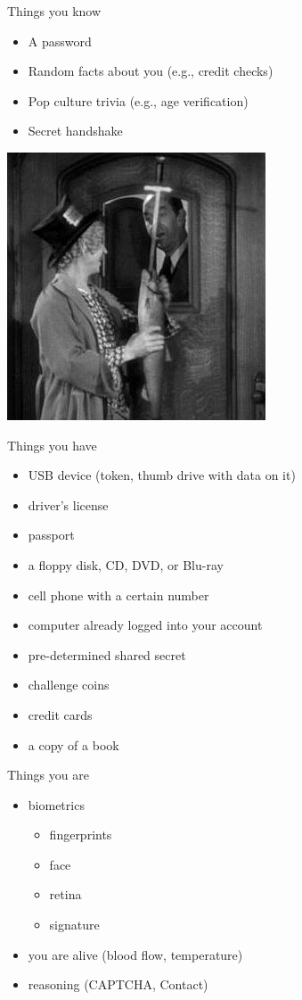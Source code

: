 \documentclass{beamer}
\begin{document}
\begin{frame}{Things you know}

\begin{itemize}
  \item A password
  \item Random facts about you (e.g., credit checks)
  \item Pop culture trivia (e.g., age verification)
  \item Secret handshake
\end{itemize}

\begin{center}
  \includegraphics[width=.4\textwidth]{swordfish.jpg}
\end{center}

\end{frame}

\begin{frame}{Things you have}

\begin{itemize}
  \item USB device (token, thumb drive with data on it)
  \item driver's license
  \item passport
  \item a floppy disk, CD, DVD, or Blu-ray
  \item cell phone with a certain number
  \item computer already logged into your account
  \item pre-determined shared secret
  \item challenge coins
  \item credit cards
  \item a copy of a book
\end{itemize}
\end{frame}

\begin{frame}{Things you are}

\begin{itemize}
  \item biometrics
  \begin{itemize}
    \item fingerprints
    \item face
    \item retina
    \item signature
  \end{itemize}
  \item you are alive (blood flow, temperature)
  \item reasoning (CAPTCHA, Contact)
\end{itemize}
\end{frame}
\end{document}
